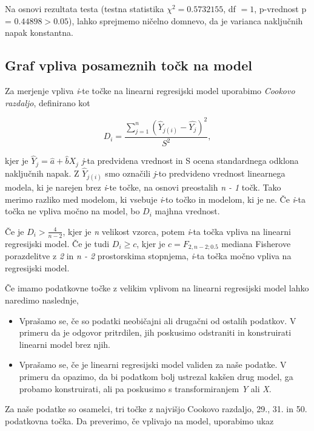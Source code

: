 Na osnovi rezultata testa (testna statistika $\chi^{2} = 0.5732155$, df $= 1$, p-vrednost p = $0.44898 > 0.05$),
lahko sprejmemo ničelno domnevo, da je varianca naključnih napak konstantna.

\subsection{Graf vpliva posameznih točk na model}

Za merjenje vpliva \emph{i}-te točke na linearni regresijski model uporabimo \emph{Cookovo razdaljo}, definirano kot

\begin{equation}
    D_{i} = \frac{\sum_{j=1}^{n} (\widehat{Y}_{j(i)} - \widehat{Y_{j}})^{2}}{S^{2}},
\end{equation}

kjer je $\widehat{Y}_{j} = \widehat{a} + \widehat{b}X_{j}$ \emph{j}-ta predvidena vrednost in S ocena standardnega
odklona naključnih napak.
Z $\widehat{Y}_{j(i)}$ smo označili \emph{j}-to predvideno vrednost linearnega modela, ki je narejen brez \emph{i}-te
točke, na osnovi preostalih \emph{n - 1} točk.
Tako merimo razliko med modelom, ki vsebuje \emph{i}-to točko in modelom, ki je ne.
Če \emph{i}-ta točka ne vpliva močno na model, bo $D_{i}$ majhna vrednost.

Če je $D_{i} > \frac{4}{n - 2}$, kjer je \emph{n} velikost vzorca, potem \emph{i}-ta točka vpliva na linearni
regresijski model.
Če je tudi $D_{i} \geq c$, kjer je $c = F_{2,n - 2;0.5}$ mediana Fisherove porazdelitve z \emph{2} in \emph{n - 2}
prostorskima stopnjema, \emph{i}-ta točka močno vpliva na regresijski model.

Če imamo podatkovne točke z velikim vplivom na linearni regresijski model lahko naredimo naslednje,

\begin{itemize}
    \item Vprašamo se, če so podatki neobičajni ali drugačni od ostalih podatkov. V primeru da je odgovor pritrdilen,
    jih poskusimo odstraniti in konstruirati linearni model brez njih.
    \item Vprašamo se, če je linearni regresijski model validen za naše podatke. V primeru da opazimo, da bi podatkom
    bolj ustrezal kakšen drug model, ga probamo konstruirati, ali pa poskusimo s transformiranjem \emph{Y} ali \emph{X}.
\end{itemize}

Za naše podatke so osamelci, tri točke z najvišjo Cookovo razdaljo, 29., 31. in 50. podatkovna točka.
Da preverimo, če vplivajo na model, uporabimo ukaz

